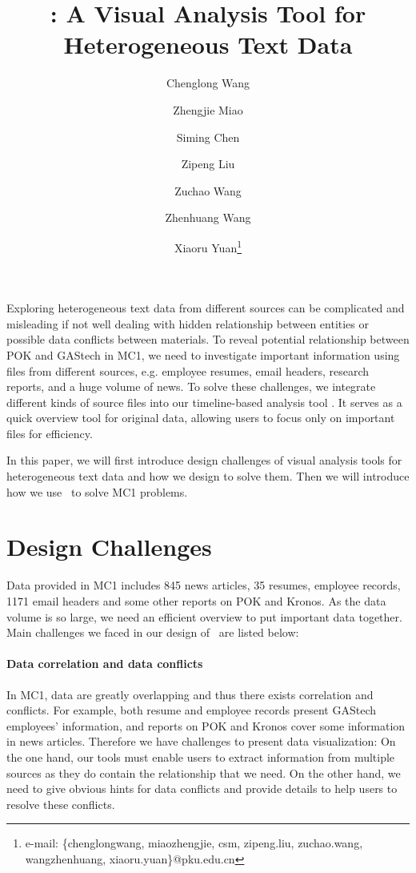 \documentclass{vgtc}                          %
\title{\projectname: A Visual Analysis Tool for Heterogeneous Text Data}
\author{Chenglong Wang%
\and Zhengjie Miao %
\and Siming Chen
\and Zipeng Liu
\and Zuchao Wang
\and Zhenhuang Wang
\and Xiaoru Yuan\thanks{e-mail: \{chenglongwang, miaozhengjie, csm, zipeng.liu, zuchao.wang, wangzhenhuang, xiaoru.yuan\}@pku.edu.cn}}
\affiliation{\scriptsize Peking University}
\begin{document}


\maketitle

Exploring heterogeneous text data from different sources can be complicated and misleading if not well dealing with hidden relationship between entities or possible data conflicts between materials. 
To reveal potential relationship between POK and GAStech in MC1, we need to investigate important information using files from different sources, e.g. employee resumes, email headers, research reports, and a huge volume of news. To solve these challenges, we integrate different kinds of source files into our timeline-based analysis tool \projectname. It serves as a quick overview tool for original data, allowing users to focus only on important files for efficiency. 
\par
In this paper, we will first introduce design challenges of visual analysis tools for heterogeneous text data and how we design \projectname to solve them. Then we will introduce how we use \projectname\ to solve MC1 problems.


\section{Design Challenges}
Data provided in MC1 includes 845 news articles, 35 resumes, employee records, 1171 email headers and some other reports on POK and Kronos. As the data volume is so large, we need an efficient overview to put important data together. Main challenges we faced in our design of \projectname\ are listed below:
\paragraph{Data correlation and data conflicts}
In MC1, data are greatly overlapping and thus there exists correlation and conflicts. For example, both resume and employee records present GAStech employees' information, and reports on POK and Kronos cover some information in news articles. Therefore we have challenges to present data visualization: On the one hand, our tools must enable users to extract information from multiple sources as they do contain the relationship that we need. On the other hand, we need to give obvious hints for data conflicts and provide details to help users to resolve these conflicts. 
\end{document}
